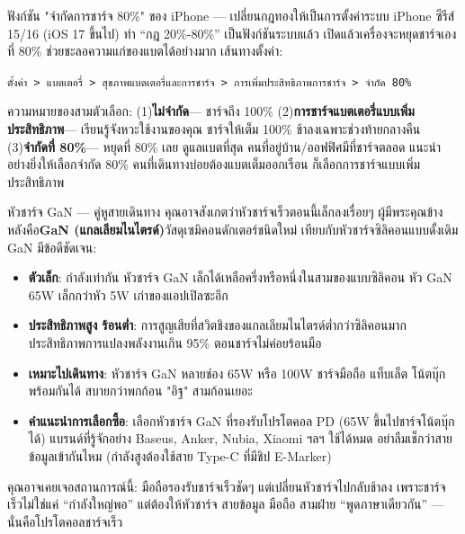 \begin{tcbinfo}{ฟังก์ชัน "จำกัดการชาร์จ 80\%" ของ iPhone — เปลี่ยนกฎทองให้เป็นการตั้งค่าระบบ}
iPhone ซีรีส์ 15/16 (iOS 17 ขึ้นไป) ทำ “กฎ 20\%-80\%” เป็นฟังก์ชันระบบแล้ว เปิดแล้วเครื่องจะหยุดชาร์จเองที่ 80\% ช่วยชะลอความแก่ของแบตได้อย่างมาก เส้นทางตั้งค่า:

\texttt{ตั้งค่า > แบตเตอรี่ > สุขภาพแบตเตอรี่และการชาร์จ > การเพิ่มประสิทธิภาพการชาร์จ > จำกัด 80\%}

ความหมายของสามตัวเลือก: (1)\textbf{ไม่จำกัด}— ชาร์จถึง 100\% (2)\textbf{การชาร์จแบตเตอรี่แบบเพิ่มประสิทธิภาพ}— เรียนรู้จังหวะใช้งานของคุณ ชาร์จให้เต็ม 100\% ช้าลงเฉพาะช่วงท้ายกลางคืน (3)\textbf{จำกัดที่ 80\%}— หยุดที่ 80\% เลย ดูแลแบตที่สุด คนที่อยู่บ้าน/ออฟฟิศมีที่ชาร์จตลอด แนะนำอย่างยิ่งให้เลือกจำกัด 80\% คนที่เดินทางบ่อยต้องแบตเต็มออกเรือน ก็เลือกการชาร์จแบบเพิ่มประสิทธิภาพ

\end{tcbinfo}

\begin{tcbinfo}{หัวชาร์จ GaN — คู่หูสายเดินทาง}
คุณอาจสังเกตว่าหัวชาร์จเร็วตอนนี้เล็กลงเรื่อยๆ ผู้มีพระคุณข้างหลังคือ\textbf{GaN (แกลเลียมไนไตรด์)}วัสดุเซมิคอนดักเตอร์ชนิดใหม่ เทียบกับหัวชาร์จซิลิคอนแบบดั้งเดิม GaN มีข้อดีชัดเจน:

\begin{itemize}
  \item \textbf{ตัวเล็ก}: กำลังเท่ากัน หัวชาร์จ GaN เล็กได้เหลือครึ่งหรือหนึ่งในสามของแบบซิลิคอน หัว GaN 65W เล็กกว่าหัว 5W เก่าของแอปเปิลซะอีก
  \item \textbf{ประสิทธิภาพสูง ร้อนต่ำ}: การสูญเสียที่สวิตชิงของแกลเลียมไนไตรด์ต่ำกว่าซิลิคอนมาก ประสิทธิภาพการแปลงพลังงานเกิน 95\% ตอนชาร์จไม่ค่อยร้อนมือ
  \item \textbf{เหมาะไปเดินทาง}: หัวชาร์จ GaN หลายช่อง 65W หรือ 100W ชาร์จมือถือ แท็บเล็ต โน้ตบุ๊กพร้อมกันได้ สบายกว่าพกก้อน "อิฐ" สามก้อนเยอะ
  \item \textbf{คำแนะนำการเลือกซื้อ}: เลือกหัวชาร์จ GaN ที่รองรับโปรโตคอล PD (65W ขึ้นไปชาร์จโน้ตบุ๊กได้) แบรนด์ที่รู้จักอย่าง Baseus, Anker, Nubia, Xiaomi ฯลฯ ใช้ได้หมด อย่าลืมเช็กว่าสายข้อมูลเข้ากันไหม (กำลังสูงต้องใช้สาย Type-C ที่มีชิป E-Marker)
\end{itemize}

\end{tcbinfo}

คุณอาจเคยเจอสถานการณ์นี้: มือถือรองรับชาร์จเร็วชัดๆ แต่เปลี่ยนหัวชาร์จไปกลับช้าลง เพราะชาร์จเร็วไม่ใช่แค่ “กำลังใหญ่พอ” แต่ต้องให้หัวชาร์จ สายข้อมูล มือถือ สามฝ่าย “พูดภาษาเดียวกัน” — นั่นคือโปรโตคอลชาร์จเร็ว

